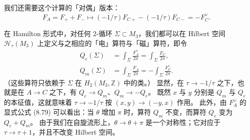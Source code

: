 我们还需要这个计算的「对偶」版本：
\begin{equation}
  \tag{8.82}
  \label{eq:8-82}
  F_{A}=F_{+}+F_{-}\mapsto\overline{\left(-1/\tau\right)}F_{C+}-\left(-1/\tau\right)F_{C-}=-F_{C}^{\vee}.
\end{equation}


在 Hamilton 形式中，对任何 2-循环 $\Sigma\subset M_{3}$，我们都可以在 Hilbert 空间 $\mathcal{H}_{\tau}(M_{3})$ 上定义与之相应的「电」算符与「磁」算符，即令
\begin{equation}
  \tag{8.83}
  \label{eq:8-83}
  \begin{aligned}
  Q_{e}(\Sigma)&=\int_{\Sigma}\frac{F_{A}^{\vee}}{2\pi}=\int_{\Sigma}\frac{F_{C}}{2\pi},\\
  Q_{m}(\Sigma)&=\int_{\Sigma}\frac{F_{A}}{2\pi}=-\int_{\Sigma}\frac{F_{C}^{\vee}}{2\pi}.
  \end{aligned}
\end{equation}
（这些算符只依赖于 $\Sigma$ 在 $H_{2}(M_{3},\mathbb{Z})$ 中的类。）
显然，在 $\tau\to-1/\tau$ 之下，也就是在 $A\to C$ 之下，有 $Q_{e}\to Q_{m}$、$Q_{m}\to-Q_{e}$。
既然 $x$ 与 $y$ 分别是 $Q_{m}$ 与 $Q_{e}$ 的本征值，这就意味着 $\tau\to-1/\tau$ 按 $(x,y)\to(-y,x)$ 作用。
此外，由 $F_{A}^{\vee}$ 的显式公式 (8.79) 可以看出：当 $\theta$ 增加 $\pi$ 时，算符 $Q_{m}$ 不变，而算符 $Q_{e}$ 变为 $Q_{e}+Q_{m}$。
由于我们在自旋流形上，$\theta\to\theta+\pi$ 是一个对称性；它对应于 $\tau\to\tau+1$，并且不改变 Hilbert 空间。

